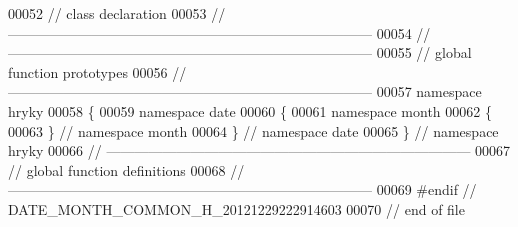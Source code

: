 \begin{DoxyCode}
00052 \textcolor{comment}{// class declaration}
00053 \textcolor{comment}{//
      ------------------------------------------------------------------------------}
00054 \textcolor{comment}{//
      ------------------------------------------------------------------------------}
00055 \textcolor{comment}{// global function prototypes}
00056 \textcolor{comment}{//
      ------------------------------------------------------------------------------}
00057 \textcolor{keyword}{namespace }hryky
00058 \{
00059 \textcolor{keyword}{namespace }date
00060 \{
00061 \textcolor{keyword}{namespace }month
00062 \{
00063 \} \textcolor{comment}{// namespace month}
00064 \} \textcolor{comment}{// namespace date}
00065 \} \textcolor{comment}{// namespace hryky}
00066 \textcolor{comment}{//
      ------------------------------------------------------------------------------}
00067 \textcolor{comment}{// global function definitions}
00068 \textcolor{comment}{//
      ------------------------------------------------------------------------------}
00069 \textcolor{preprocessor}{#endif // DATE\_MONTH\_COMMON\_H\_20121229222914603}
00070 \textcolor{preprocessor}{}\textcolor{comment}{// end of file}
\end{DoxyCode}
